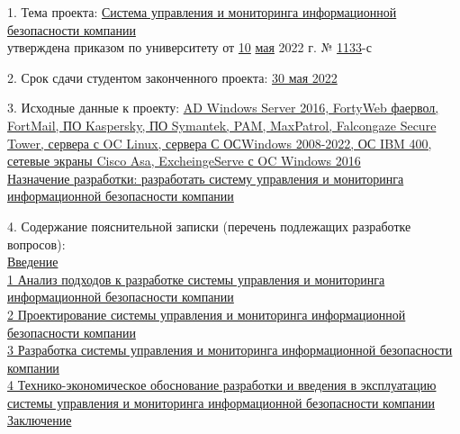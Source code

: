 {\begin{center}
  \end{center}

  1. Тема проекта: \uline{Система управления и мониторинга информационной безопасности компании}\lineunderscore\\
  утверждена приказом по университету от \uline{10} \uline{мая} 2022 г. № \uline{1133}-с

  \vspace{1em}

  2. Срок сдачи студентом законченного проекта: \uline{30 мая 2022}\lineunderscore

  \vspace{1em}

  3. Исходные данные к проекту: 
  \uline{AD Windows Server 2016, FortyWeb фаервол, FortMail, ПО Kaspersky, ПО Symantek, PAM, MaxPatrol, Falcongaze Secure Tower, сервера с OC Linux, сервера С ОСWindows 2008-2022, ОС IBM 400, сетевые экраны Cisco Asa, ExcheingeServe с OC Windows 2016}\lineunderscore\\
  \uline{\hspace*{4ex}
  Назначение разработки: разработать систему управления и мониторинга информационной безопасности компании}\lineunderscore

  \vspace{1em}


  4. Содержание пояснительной записки (перечень подлежащих разработке вопросов):
  \lineunderscore\\
  \uline{\hspace*{2ex}Введение}\lineunderscore\\
  \uline{\hspace*{2ex}1 Анализ подходов к разработке системы управления и мониторинга информационной безопасности компании}\lineunderscore\\
  \uline{\hspace*{2ex}2 Проектирование системы управления и мониторинга информационной безопасности компании}\lineunderscore\\
  \uline{\hspace*{2ex}3 Разработка системы управления и мониторинга информационной безопасности компании}\lineunderscore\\
  \uline{\hspace*{2ex}4 Технико-экономическое обоснование разработки и введения в эксплуатацию системы управления и мониторинга информационной безопасности компании}\lineunderscore\\
  \uline{\hspace*{2ex}Заключение}\lineunderscore\\
  \lineunderscore\\
  \lineunderscore\\
  \lineunderscore\\
  \lineunderscore

}
